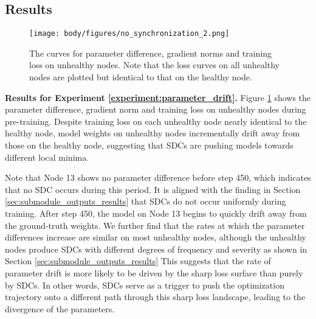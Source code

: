 \subsection{Results}
\label{results:model_quality}


\begin{figure}[t]
    \centering
    \texttt{[image: body/figures/no\_synchronization\_2.png]}
    \vskip -0.15in
    \caption{The curves for parameter difference, gradient norms and training loss on unhealthy nodes. Note that the loss curves on all unhealthy nodes are plotted but identical to that on the healthy node.}
    \label{fig:no_synchronization}
    \vskip -0.2in
\end{figure}

\textbf{Results for Experiment \ref{experiment:parameter_drift}.} 
Figure \ref{fig:no_synchronization} shows the parameter difference, gradient norm and training loss on unhealthy nodes during pre-training. Despite training loss on each unhealthy node nearly identical to the healthy node, model weights on unhealthy nodes incrementally drift away from those on the healthy node, suggesting that SDCs are pushing models towards different local minima. 

Note that Node 13 shows no parameter difference before step 450, which indicates that no SDC occurs during this period. It is aligned with the finding in Section \ref{sec:submodule_outputs_results} that SDCs do not occur uniformly during training. After step 450, the model on Node 13 begins to quickly drift away from the ground-truth weights. We further find that the rates at which the parameter differences increase are similar on most unhealthy nodes, although the unhealthy nodes produce SDCs with different degrees of frequency and severity as shown in Section \ref{sec:submodule_outputs_results} This suggests that the rate of parameter drift is more likely to be driven by the sharp loss surface than purely by SDCs. In other words, SDCs serve as a trigger to push the optimization trajectory onto a different path through this sharp loss landscape, leading to the divergence of the parameters. 

